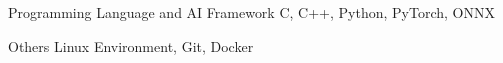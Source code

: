 

\begin{cvskills}
  \cvskill
  {Programming Language and AI Framework} %
  {C, C++, Python, PyTorch, ONNX} %

  \cvskill
  {Others}
  {Linux Environment, Git, Docker}
\end{cvskills}
